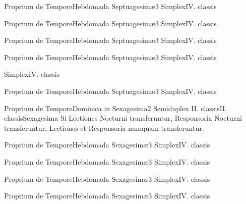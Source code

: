 \documentclass[liber-responsorialis_hiemalis.tex]{subfiles}
\begin{document}
	{Proprium de Tempore}{Hebdomada Septuagesimæ}{3}{}
	{Simplex}{IV. classis}{}
	{}
	{}

	{Proprium de Tempore}{Hebdomada Septuagesimæ}{3}{}
	{Simplex}{IV. classis}{}
	{}
	{}

	{Proprium de Tempore}{Hebdomada Septuagesimæ}{3}{}
	{Simplex}{IV. classis}{}
	{}
	{}

	{Proprium de Tempore}{Hebdomada Septuagesimæ}{3}{}
	{Simplex}{IV. classis}{}
	{}
	{}

	{Simplex}{IV. classis}{}
	{}
	{}

	{Proprium de Tempore}{Hebdomada Septuagesimæ}{3}{}
	{Simplex}{IV. classis}{}
	{}
	{}

	{Proprium de Tempore}{Dominica in Sexagesima}{2}{}
	{Semiduplex II. classis}{II. classis}{Sexagesima}
	{Si Lectiones  Nocturni transferuntur, Responsoria  Nocturni transferuntur.}
	{Lectiones et Responsoria numquam transferuntur.}

	{Proprium de Tempore}{Hebdomada Sexagesimæ}{3}{}
	{Simplex}{IV. classis}{}
	{}
	{}

	{Proprium de Tempore}{Hebdomada Sexagesimæ}{3}{}
	{Simplex}{IV. classis}{}
	{}
	{}

	{Proprium de Tempore}{Hebdomada Sexagesimæ}{3}{}
	{Simplex}{IV. classis}{}
	{}
	{}

	{Proprium de Tempore}{Hebdomada Sexagesimæ}{3}{}
	{Simplex}{IV. classis}{}
	{}
	{}
\end{document}
